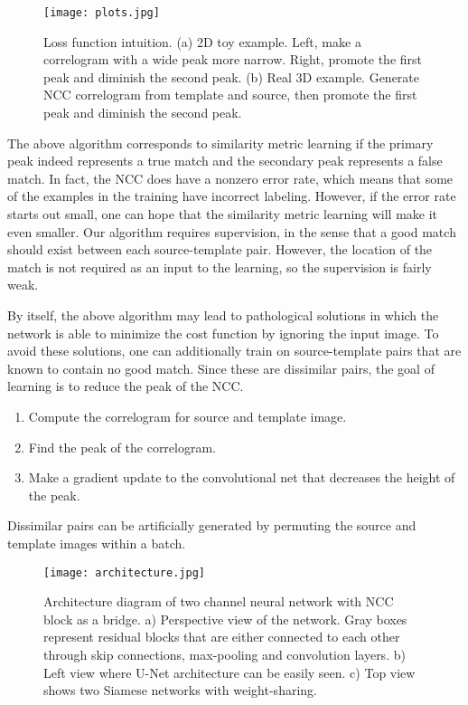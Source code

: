 \documentclass{article}
\begin{document}
\begin{figure}[h]
  \centering
  \texttt{[image: plots.jpg]}
  \caption{Loss function intuition. (a) 2D toy example. Left, make a correlogram with a wide peak more narrow. Right, promote the first peak and diminish the second peak. (b) Real 3D example. Generate NCC correlogram from template and source, then promote the first peak and diminish the second peak.}
  \label{loss_function_2D}
\end{figure}

The above algorithm corresponds to similarity metric learning if the primary peak indeed represents a true match and the secondary peak represents a false match. In fact, the NCC does have a nonzero error rate, which means that some of the examples in the training have incorrect labeling. However, if the error rate starts out small, one can hope that the similarity metric learning will make it even smaller. Our algorithm requires supervision, in the sense that a good match should exist between each source-template pair.  However, the location of the match is not required as an input to the learning, so the supervision is fairly weak.

By itself, the above algorithm may lead to pathological solutions in which the network is able to minimize the cost function by ignoring the input image. To avoid these solutions, one can additionally train on source-template pairs that are known to contain no good match. Since these are dissimilar pairs, the goal of learning is to reduce the peak of the NCC.
\begin{enumerate}
\item Compute the correlogram for source and template image. 
\item Find the peak of the correlogram. 
\item Make a gradient update to the convolutional net that decreases the height of the peak. 
\end{enumerate}
Dissimilar pairs can be artificially generated by permuting the source and template images within a batch. 


\label{gen_inst}



 



\begin{figure}[h]
  \centering
  
  \texttt{[image: architecture.jpg]}
  \caption{Architecture diagram of two channel neural network with NCC block as a bridge. a) Perspective view of the network. Gray boxes represent residual blocks that are either connected to each other through skip connections, max-pooling and convolution layers. b) Left view where U-Net architecture can be easily seen. c) Top view shows two Siamese networks with weight-sharing.}
  \label{architecture}
\end{figure}
\end{document}
